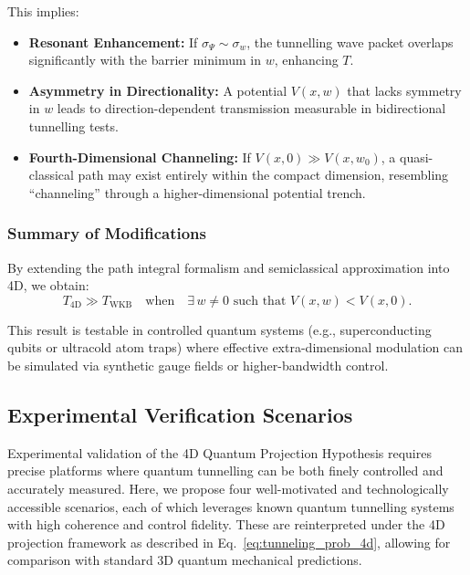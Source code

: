 \documentclass[12pt]{article}
\begin{document}
This implies:
\begin{itemize}
    \item \textbf{Resonant Enhancement:} If \( \sigma_\Psi \sim \sigma_w \), the tunnelling wave packet overlaps significantly with the barrier minimum in \( w \), enhancing \( T \).
    \item \textbf{Asymmetry in Directionality:} A potential \( V(x, w) \) that lacks symmetry in \( w \) leads to direction-dependent transmission measurable in bidirectional tunnelling tests.
    \item \textbf{Fourth-Dimensional Channeling:} If \( V(x, 0) \gg V(x, w_0) \), a quasi-classical path may exist entirely within the compact dimension, resembling “channeling” through a higher-dimensional potential trench.
\end{itemize}

\subsubsection*{Summary of Modifications}

By extending the path integral formalism and semiclassical approximation into 4D, we obtain:
\begin{equation}
T_{\text{4D}} \gg T_{\text{WKB}} \quad \text{when} \quad \exists \, w \neq 0 \text{ such that } V(x, w) < V(x, 0).
\label{eq:inequality_t}
\end{equation}

This result is testable in controlled quantum systems (e.g., superconducting qubits or ultracold atom traps) where effective extra-dimensional modulation can be simulated via synthetic gauge fields or higher-bandwidth control.


\subsection{Experimental Verification Scenarios}

Experimental validation of the 4D Quantum Projection Hypothesis requires precise platforms where quantum tunnelling can be both finely controlled and accurately measured. Here, we propose four well-motivated and technologically accessible scenarios, each of which leverages known quantum tunnelling systems with high coherence and control fidelity. These are reinterpreted under the 4D projection framework as described in Eq.~\eqref{eq:tunneling_prob_4d}, allowing for comparison with standard 3D quantum mechanical predictions.
\end{document}

